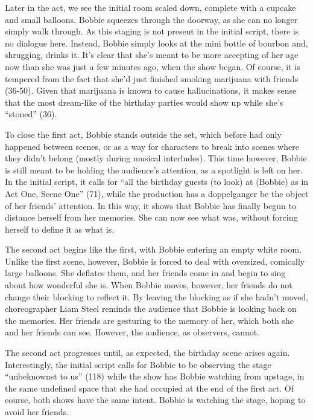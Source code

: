 \documentclass[12pt]{article}[titlepage]
\newcommand{\say}[1]{``#1''}
\newcommand{\1}{\={a}}
\newcommand{\2}{\={e}}
\newcommand{\3}{\={\i}}
\newcommand{\4}{\=o}
\newcommand{\5}{\=u}
\newcommand{\6}{\={A}}
\renewcommand{\,}{\textsuperscript{,}}
\begin{document}
Later in the act, we see the initial room scaled down, complete with a cupcake and small balloons.
Bobbie squeezes through the doorway, as she can no longer simply walk through.
As this staging is not present in the initial script, there is no dialogue here.
Instead, Bobbie simply looks at the mini bottle of bourbon and, shrugging, drinks it.
It's clear that she's meant to be more accepting of her age now than she was just a few minutes ago, when the show began.
Of course, it is tempered from the fact that she'd just finished smoking marijuana with friends (36-50).
Given that marijuana is known to cause hallucinations, it makes sense that the most dream-like of the birthday parties would show up while she's \say{stoned} (36).

To close the first act, Bobbie stands outside the set, which before had only happened between scenes, or as a way for characters to break into scenes where they didn't belong (mostly during musical interludes).
This time however, Bobbie is still meant to be holding the audience's attention, as a spotlight is left on her.
In the initial script, it calls for \say{all the birthday guests (to look) at (Bobbie) as in Act One, Scene One} (71), while the production has a doppelganger be the object of her friends' attention.
In this way, it shows that Bobbie has finally begun to distance herself from her memories.
She can now see what was, without forcing herself to define it as what is.

The second act begins like the first, with Bobbie entering an empty white room.
Unlike the first scene, however, Bobbie is forced to deal with oversized, comically large balloons.
She deflates them, and her friends come in and begin to sing about how wonderful she is.
When Bobbie moves, however, her friends do not change their blocking to reflect it.
By leaving the blocking as if she hadn't moved, choreographer Liam Steel reminds the audience that Bobbie is looking back on the memories.
Her friends are gesturing to the memory of her, which both she and her friends can see.
However, the audience, as observers, cannot.

The second act progresses until, as expected, the birthday scene arises again.
Interestingly, the initial script calls for Bobbie to be observing the stage \say{unbeknownst to us} (118) while the show has Bobbie watching from upstage, in the same undefined space that she had occupied at the end of the first act.
Of course, both shows have the same intent.
Bobbie is watching the stage, hoping to avoid her friends.
\end{document}
